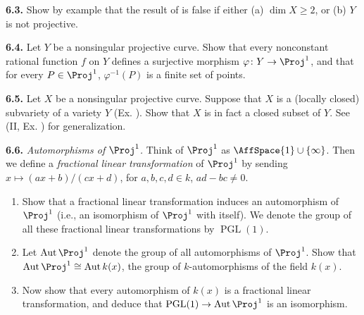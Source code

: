 {\smallskip
\noindent\hypertarget{ex-I-6.3}{}\textbf{6.3.} Show by example that the result of  is false if either (a) $\dim X\ge2$, or (b) $Y$ is not projective.

\smallskip
\noindent\hypertarget{ex-I-6.4}{}\textbf{6.4.} Let $Y$ be a nonsingular projective curve. Show that every nonconstant rational function $f$ on $Y$ defines a surjective morphism $\varphi\colon Y\to\Proj^1$, and that for every $P\in\Proj^1$, $\varphi^{-1}(P)$ is a finite set of points.

\smallskip
\noindent\hypertarget{ex-I-6.5}{}\textbf{6.5.} Let $X$ be a nonsingular projective curve. Suppose that $X$ is a (locally closed) subvariety of a variety $Y$ (Ex. ). Show that $X$ is in fact a closed subset of $Y$. See (II, Ex. ) for generalization.

\smallskip
\noindent\hypertarget{ex-I-6.6}{}\textbf{6.6.} \emph{Automorphisms of $\Proj^1$.} Think of $\Proj^1$ as $\AffSpace{1}\cup\{\infty\}$. Then we define a \emph{fractional linear transformation} of $\Proj^1$ by sending $x\mapsto(ax+b)/(cx+d)$, for $a,b,c,d\in k$, $ad-bc\ne0$.
\begin{enumerate}[label=(\alph*),leftmargin=2.4em,nosep]
\item Show that a fractional linear transformation induces an automorphism of $\Proj^1$ (i.e., an isomorphism of $\Proj^1$ with itself). We denote the group of all these fractional linear transformations by $\operatorname{PGL}(1)$.
\item Let $\operatorname{Aut}\Proj^1$ denote the group of all automorphisms of $\Proj^1$. Show that $\operatorname{Aut}\Proj^1\cong\operatorname{Aut}k(x)$, the group of $k$-automorphisms of the field $k(x)$.
\item Now show that every automorphism of $k(x)$ is a fractional linear transformation, and deduce that $\operatorname{PGL}(1)\to\operatorname{Aut}\Proj^1$ is an isomorphism.
\end{enumerate}}
